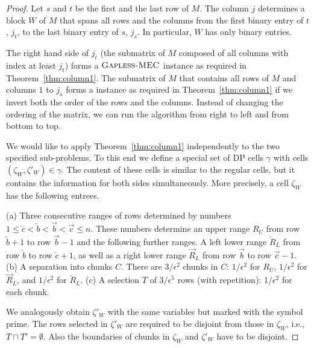 \begin{proof}
    Let $s$ and $t$ be the first and the last row of $M$.
    The column $j$ determines a block $W$ of $M$ that spans all rows and the columns from the first binary entry of $t$, $j_t$, to the last binary entry of $s$, $j_s$.
    In particular, $W$ has only binary entries.

    The right hand side of $j_t$ (the submatrix of $M$ composed of all columns with index at least $j_t$) forms a $\textsc{Gapless-MEC}$ instance as required in Theorem~\ref{thm:column1}.
    The submatrix of $M$ that contains all rows of $M$ and columns $1$ to $j_s$ forms a \GMEC instance as required in Theorem~\ref{thm:column1} if we invert both the order of the rows and the columns.
    Instead of changing the ordering of the matrix, we can run the algorithm from right to left and from bottom to top.

    We would like to apply Theorem~\ref{thm:column1} independently to the two specified sub-problems.
    To this end we define a special set of DP cells $\gamma$ with cells $(\zeta_W,\zeta'_W) \in \gamma$.
    The content of these cells is similar to the regular cells, but it contains the information for both sides simultaneously.
    More precisely, a cell $\zeta_W$ has the following entrees.

    (a) Three consecutive ranges of rows determined by numbers $1\le \overleftarrow{c} < \overleftarrow{b} < \overrightarrow{b} < \overrightarrow{c} \le n$.
    These numbers determine an upper range $R_U$ from row $\overleftarrow{b}+1$ to row $\overrightarrow{b}-1$ and the following further ranges.
    A left lower range $\overleftarrow{R}_L$ from row $\overleftarrow{b}$ to row $\overleftarrow{c}+1$,
    as well as a right lower range $\overrightarrow{R}_L$ from row $\overrightarrow{b}$ to row $\overrightarrow{c}-1$.
    (b) A separation into chunks $C$. There are $3/\epsilon^2$ chunks in $C$: $1/\epsilon^2$ for $R_U$,  $1/\epsilon^2$ for $\overrightarrow{R}_L$, and  $1/\epsilon^2$ for $\overleftarrow{R}_L$.
    (c) A selection $T$ of $3/\epsilon^5$ rows (with repetition): $1/\epsilon^2$ for each chunk.

    We analogously obtain $\zeta'_W$ with the same variables but marked with the symbol prime.
    The rows selected in $\zeta'_W$ are required to be disjoint from those in $\zeta_W$, i.e., $T \cap T' = \emptyset$.
    Also the boundaries of chunks in $\zeta_W$ and $\zeta'_W$ have to be disjoint.


\end{proof}
